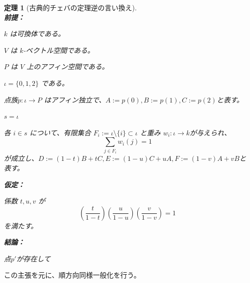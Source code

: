 \documentclass[a4paper,12pt]{bxjsbook}
\newlength{\customindent}
\newenvironment{body}{
  \par
  \begingroup
  \setlength{\leftskip}{\customindent}
  \setlength{\rightskip}{0pt}
  \setlength{\parindent}{1em}
  \setlength{\displayindent}{\customindent}
  \setlength{\displaywidth}{\dimexpr\linewidth-\customindent\relax}
}{
  \par
  \endgroup
}
\theoremstyle{theorem}
\newtheorem{theorem}{定理}[chapter]
\begin{document}
    \begin{theorem}[古典的チェバの定理逆の言い換え]
        \noindent\textbf{\\前提：}\par
        \begin{theoremenumerate}[label=(P\arabic*), leftmargin=4em, topsep=2pt, partopsep=0pt, itemsep=0pt, parsep=0pt]
            \item $k$ は可換体である。
            \item $V$ は $k$-ベクトル空間である。
            \item $P$ は $V$ 上のアフィン空間である。
            \item $\iota = \{0,1,2\}$ である。
            \item 点族$p:\iota \to P$ はアフィン独立で、$A:=p(0), B:=p(1), C:=p(2)$と表す。
            \item $s = \iota$          
            \item 各 $i\in s$ について、有限集合 $F_i:=\iota\setminus\{i\}\subset \iota$ と重み $w_i:\iota\to k$が与えられ、
            \[
            \sum_{j\in F_i} w_i(j)=1
            \]
            が成立し、$D:=(1-t)B+tC, E:=(1-u)C+uA, F:=(1-v)A+vB$と表す。
        \end{theoremenumerate}
      
        \noindent\textbf{仮定：}\par
        \begin{theoremenumerate}[label=(A\arabic*), leftmargin=4em, topsep=2pt, partopsep=0pt, itemsep=0pt, parsep=0pt]
            \item 係数 $t,u,v$ が
            \[
            \left(\frac{t}{1-t}\right)\left(\frac{u}{1-u}\right)\left(\frac{v}{1-v}\right)=1
            \]
            を満たす。
        \end{theoremenumerate}
      
        \noindent\textbf{結論：}\par
        \begin{theoremenumerate}[label=(\roman*), leftmargin=4em, topsep=2pt, partopsep=0pt, itemsep=0pt, parsep=0pt]
            \item 点$p'$が存在して
        \end{theoremenumerate}
    \end{theorem}

    \begin{body}
        \indent この主張を元に、順方向同様一般化を行う。
    \end{body}
    
\end{document}
